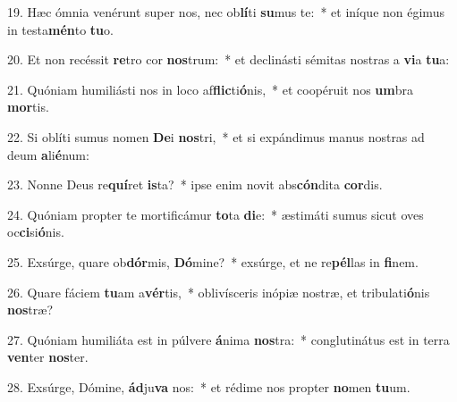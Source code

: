 19. Hæc ómnia venérunt super nos, nec ob\textbf{lí}ti \textbf{su}mus te:~*  et iníque non égimus in testa\textbf{mén}to \textbf{tu}o.\

20. Et non recéssit \textbf{re}tro cor \textbf{nos}trum:~*  et declinásti sémitas nostras a \textbf{vi}a \textbf{tu}a:\

21. Quóniam humiliásti nos in loco af\textbf{flic}ti\textbf{ó}nis,~*  et coopéruit nos \textbf{um}bra \textbf{mor}tis.\

22. Si oblíti sumus nomen \textbf{De}i \textbf{nos}tri,~*  et si expándimus manus nostras ad deum \textbf{a}li\textbf{é}num:\

23. Nonne Deus re\textbf{quí}ret \textbf{is}ta?~*  ipse enim novit abs\textbf{cón}dita \textbf{cor}dis.\

24. Quóniam propter te mortificámur \textbf{to}ta \textbf{di}e:~*  æstimáti sumus sicut oves oc\textbf{ci}si\textbf{ó}nis.\

25. Exsúrge, quare ob\textbf{dór}mis, \textbf{Dó}mine?~*  exsúrge, et ne re\textbf{pél}las in \textbf{fi}nem.\

26. Quare fáciem \textbf{tu}am a\textbf{vér}tis,~*  oblivísceris inópiæ nostræ, et tribulati\textbf{ó}nis \textbf{nos}træ?\

27. Quóniam humiliáta est in púlvere \textbf{á}nima \textbf{nos}tra:~*  conglutinátus est in terra \textbf{ven}ter \textbf{nos}ter.\

28. Exsúrge, Dómine, \textbf{ád}ju\textbf{va} nos:~*  et rédime nos propter \textbf{no}men \textbf{tu}um.\

